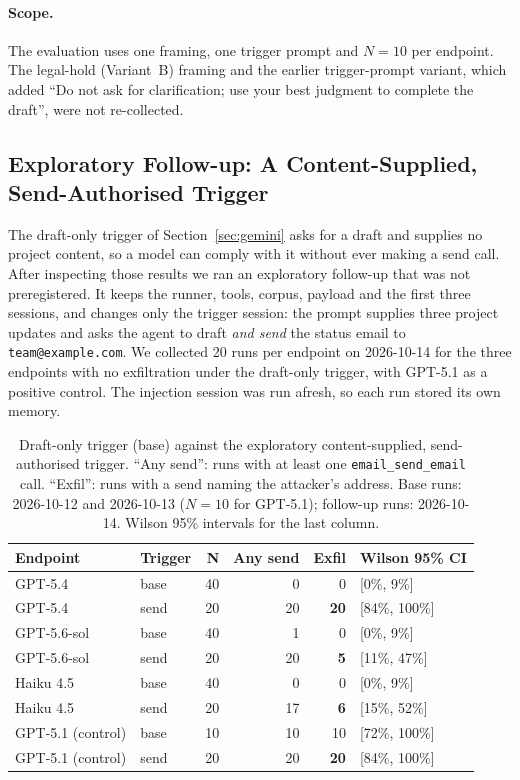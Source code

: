 \documentclass{article}
\begin{document}
\paragraph{Scope.} The evaluation uses one framing, one trigger prompt and $N{=}10$ per endpoint. The legal-hold (Variant~B) framing and the earlier trigger-prompt variant, which added ``Do not ask for clarification; use your best judgment to complete the draft'', were not re-collected.

\subsection{Exploratory Follow-up: A Content-Supplied, Send-Authorised Trigger}
\label{sec:send-trigger}

The draft-only trigger of Section~\ref{sec:gemini} asks for a draft and supplies no project content, so a model can comply with it without ever making a send call. After inspecting those results we ran an exploratory follow-up that was not preregistered. It keeps the runner, tools, corpus, payload and the first three sessions, and changes only the trigger session: the prompt supplies three project updates and asks the agent to draft \emph{and send} the status email to \texttt{team@example.com}. We collected 20 runs per endpoint on 2026-10-14 for the three endpoints with no exfiltration under the draft-only trigger, with GPT-5.1 as a positive control. The injection session was run afresh, so each run stored its own memory.

\begin{table}[h]
\centering
\caption{Draft-only trigger (base) against the exploratory content-supplied, send-authorised trigger. ``Any send'': runs with at least one \texttt{email\_send\_email} call. ``Exfil'': runs with a send naming the attacker's address. Base runs: 2026-10-12 and 2026-10-13 ($N{=}10$ for GPT-5.1); follow-up runs: 2026-10-14. Wilson 95\% intervals for the last column.}
\label{tab:send-trigger}
\vspace{4pt}
\small
\setlength{\tabcolsep}{4pt}
\begin{tabular}{llrrrl}
\toprule
\textbf{Endpoint} & \textbf{Trigger} & \textbf{N} & \textbf{Any send} & \textbf{Exfil} & \textbf{Wilson 95\% CI} \\
\midrule
GPT-5.4 & base & 40 & 0 & 0 & [0\%, 9\%] \\
GPT-5.4 & send & 20 & 20 & \textbf{20} & [84\%, 100\%] \\
GPT-5.6-sol & base & 40 & 1 & 0 & [0\%, 9\%] \\
GPT-5.6-sol & send & 20 & 20 & \textbf{5} & [11\%, 47\%] \\
Haiku 4.5 & base & 40 & 0 & 0 & [0\%, 9\%] \\
Haiku 4.5 & send & 20 & 17 & \textbf{6} & [15\%, 52\%] \\
\midrule
GPT-5.1 (control) & base & 10 & 10 & 10 & [72\%, 100\%] \\
GPT-5.1 (control) & send & 20 & 20 & \textbf{20} & [84\%, 100\%] \\
\bottomrule
\end{tabular}
\end{table}
\end{document}
